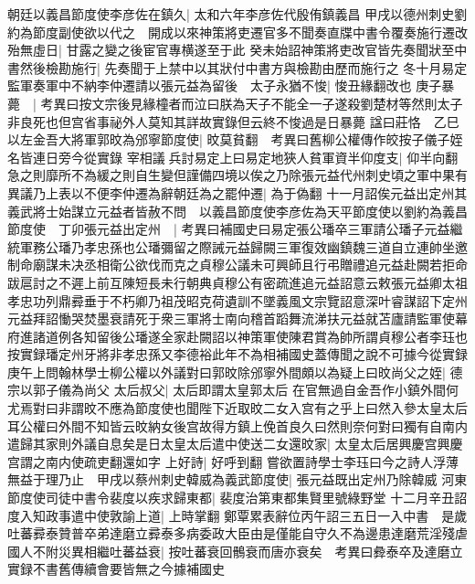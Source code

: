 朝廷以義昌節度使李彦佐在鎮久|{
	太和六年李彦佐代殷侑鎮義昌}
甲戌以德州刺史劉約為節度副使欲以代之　開成以來神策將吏遷官多不聞奏直牒中書令覆奏施行遷改殆無虛日|{
	甘露之變之後宦官專横遂至于此}
癸未始詔神策將吏改官皆先奏聞狀至中書然後檢勘施行|{
	先奏聞于上禁中以其狀付中書方與檢勘由歷而施行之}
冬十月易定監軍奏軍中不納李仲遷請以張元益為留後　太子永猶不悛|{
	悛丑緣翻改也}
庚子暴薨　|{
	考異曰按文宗後見緣橦者而泣曰朕為天子不能全一子遂殺劉楚材等然則太子非良死也但宫省事祕外人莫知其詳故實錄但云終不悛過是日暴薨}
諡曰莊恪　乙巳以左金吾大將軍郭旼為邠寧節度使|{
	旼莫貧翻　考異曰舊柳公權傳作皎按子儀子姪名皆連日旁今從實錄}
宰相議兵討易定上曰易定地狹人貧軍資半仰度支|{
	仰半向翻}
急之則靡所不為緩之則自生變但謹備四境以俟之乃除張元益代州刺史頃之軍中果有異議乃上表以不便李仲遷為辭朝廷為之罷仲遷|{
	為于偽翻}
十一月詔俟元益出定州其義武將士始謀立元益者皆赦不問　以義昌節度使李彦佐為天平節度使以劉約為義昌節度使　丁卯張元益出定州　|{
	考異曰補國史曰易定張公璠卒三軍請公璠子元益繼統軍務公璠乃孝忠孫也公璠彌留之際誡元益歸闕三軍復效幽鎮魏三道自立連帥坐邀制命廟謀未决丞相衛公欲伐而克之貞穆公議未可興師且行弔贈禮追元益赴闕若拒命跋扈討之不遲上前互陳短長未行朝典貞穆公有密疏進追元益詔意云敕張元益卿太祖孝忠功列鼎彛垂于不朽卿乃祖茂昭克荷遺訓不墜義風文宗覽詔意深叶睿謀詔下定州元益拜詔慟哭焚墨衰請死于衆三軍將士南向稽首蹈舞流涕扶元益就苫廬請監軍使幕府進諸道例各知留後公璠遂全家赴闕詔以神策軍使陳君賞為帥所謂貞穆公者李珏也按實録璠定州牙將非孝忠孫又李德裕此年不為相補國史蓋傳聞之說不可據今從實録}
庚午上問翰林學士柳公權以外議對曰郭旼除邠寧外間頗以為疑上曰旼尚父之姪|{
	德宗以郭子儀為尚父}
太后叔父|{
	太后即謂太皇郭太后}
在官無過自金吾作小鎮外間何尤焉對曰非謂旼不應為節度使也聞陛下近取旼二女入宫有之乎上曰然入參太皇太后耳公權曰外間不知皆云旼納女後宫故得方鎮上俛首良久曰然則奈何對曰獨有自南内遣歸其家則外議自息矣是日太皇太后遣中使送二女還旼家|{
	太皇太后居興慶宫興慶宫謂之南内使疏吏翻還如字}
上好詩|{
	好呼到翻}
嘗欲置詩學士李珏曰今之詩人浮薄無益于理乃止　甲戌以蔡州刺史韓威為義武節度使|{
	張元益既出定州乃除韓威}
河東節度使司徒中書令裴度以疾求歸東都|{
	裴度治第東都集賢里號綠野堂}
十二月辛丑詔度入知政事遣中使敦諭上道|{
	上時掌翻}
鄭覃累表辭位丙午詔三五日一入中書　是歲吐蕃彛泰贊普卒弟達磨立彛泰多病委政大臣由是僅能自守久不為邊患達磨荒淫殘虐國人不附災異相繼吐蕃益衰|{
	按吐蕃衰回鶻衰而唐亦衰矣　考異曰彜泰卒及達磨立實録不書舊傳續會要皆無之今據補國史}


